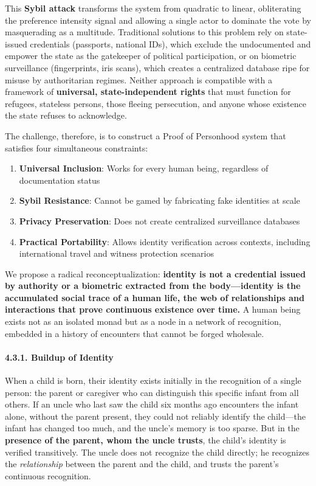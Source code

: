 This \textbf{Sybil attack} transforms the system from quadratic to
linear, obliterating the preference intensity signal and allowing a
single actor to dominate the vote by masquerading as a multitude.
Traditional solutions to this problem rely on state-issued credentials
(passports, national IDs), which exclude the undocumented and empower
the state as the gatekeeper of political participation, or on biometric
surveillance (fingerprints, iris scans), which creates a centralized
database ripe for misuse by authoritarian regimes. Neither approach is
compatible with a framework of \textbf{universal, state-independent
rights} that must function for refugees, stateless persons, those
fleeing persecution, and anyone whose existence the state refuses to
acknowledge.

The challenge, therefore, is to construct a Proof of Personhood system
that satisfies four simultaneous constraints:

\begin{enumerate}
\def\labelenumi{\arabic{enumi}.}
\tightlist
\item
  \textbf{Universal Inclusion}: Works for every human being, regardless
  of documentation status
\item
  \textbf{Sybil Resistance}: Cannot be gamed by fabricating fake
  identities at scale
\item
  \textbf{Privacy Preservation}: Does not create centralized
  surveillance databases
\item
  \textbf{Practical Portability}: Allows identity verification across
  contexts, including international travel and witness protection
  scenarios
\end{enumerate}

We propose a radical reconceptualization: \textbf{identity is not a
credential issued by authority or a biometric extracted from the
body---identity is the accumulated social trace of a human life, the web
of relationships and interactions that prove continuous existence over
time.} A human being exists not as an isolated monad but as a node in a
network of recognition, embedded in a history of encounters that cannot
be forged wholesale.

\paragraph{4.3.1. Buildup of Identity}\label{buildup-of-identity}

When a child is born, their identity exists initially in the recognition
of a single person: the parent or caregiver who can distinguish this
specific infant from all others. If an uncle who last saw the child six
months ago encounters the infant alone, without the parent present, they
could not reliably identify the child---the infant has changed too much,
and the uncle's memory is too sparse. But in the \textbf{presence of the
parent, whom the uncle trusts}, the child's identity is verified
transitively. The uncle does not recognize the child directly; he
recognizes the \emph{relationship} between the parent and the child, and
trusts the parent's continuous recognition.


